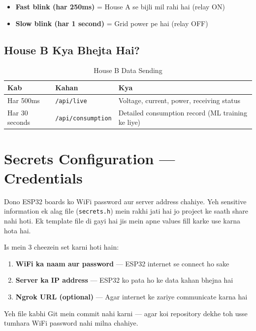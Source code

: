 \begin{itemize}[nosep]
    \item \textbf{Fast blink (har 250ms)} = House A se bijli mil rahi hai (relay ON)
    \item \textbf{Slow blink (har 1 second)} = Grid power pe hai (relay OFF)
\end{itemize}

\subsection{House B Kya Bhejta Hai?}

\begin{table}[H]
\centering
\begin{tabularx}{\textwidth}{l l X}
\toprule
\textbf{Kab} & \textbf{Kahan} & \textbf{Kya} \\
\midrule
Har 500ms & \texttt{/api/live} & Voltage, current, power, receiving status \\
Har 30 seconds & \texttt{/api/consumption} & Detailed consumption record (ML training ke liye) \\
\bottomrule
\end{tabularx}
\caption{House B Data Sending}
\end{table}

\section{Secrets Configuration --- Credentials}

Dono ESP32 boards ko WiFi password aur server address chahiye. Yeh sensitive information ek alag file (\texttt{secrets.h}) mein rakhi jati hai jo project ke saath share nahi hoti. Ek template file di gayi hai jis mein apne values fill karke use karna hota hai.

Is mein 3 cheezein set karni hoti hain:
\begin{enumerate}[nosep]
    \item \textbf{WiFi ka naam aur password} --- ESP32 internet se connect ho sake
    \item \textbf{Server ka IP address} --- ESP32 ko pata ho ke data kahan bhejna hai
    \item \textbf{Ngrok URL (optional)} --- Agar internet ke zariye communicate karna hai
\end{enumerate}

\begin{warnbox}[Security]
Yeh file kabhi Git mein commit nahi karni --- agar koi repository dekhe toh usse tumhara WiFi password nahi milna chahiye.
\end{warnbox}
